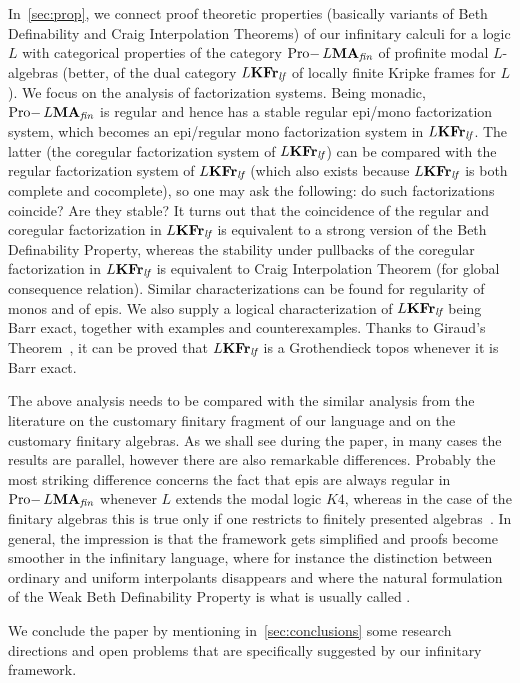 \documentclass{article}
\theoremstyle{definition}
\DeclareMathOperator{\Pro}{Pro-}
\newcommand{\KFr}{\textup{\textbf{KFr}}}
\newcommand{\MA}{\textup{\textbf{MA}}}
\newcommand{\fin}{\textit{fin}}
\newcommand{\lf}{\textit{lf}}
\begin{document}
In~\cref{sec:prop}, we connect proof theoretic properties (basically variants of Beth Definability and Craig Interpolation Theorems) of our infinitary calculi for a logic $L$ with categorical properties of the category $\Pro L\MA_\fin$ of profinite modal $L$-algebras (better, of the dual category $L\KFr_\lf$ of locally finite Kripke frames for $L$).
We focus on the analysis of factorization systems. Being monadic,  $\Pro L\MA_\fin$ is regular and hence has a stable regular epi/mono factorization system, which becomes an epi/regular mono factorization system in $L\KFr_\lf$. The latter (the coregular factorization system of $L\KFr_\lf$) can be compared with the regular factorization system of $L\KFr_\lf$ (which also exists because $L\KFr_\lf$ is both complete and cocomplete), so one may ask the following: do such factorizations coincide? Are they stable? It turns out that the coincidence of the regular and coregular factorization in $L\KFr_\lf$ is equivalent to a strong version of the Beth Definability Property, whereas the stability under pullbacks of the coregular factorization in $L\KFr_\lf$ is equivalent to Craig Interpolation Theorem (for global consequence relation). Similar characterizations can be found for regularity of monos and of epis.  
We also supply a logical characterization of $L\KFr_\lf$ being Barr exact, together with examples and counterexamples. Thanks to Giraud's Theorem~\cite[Theorem 1.4.5]{makkaireyes}, it can be proved that $L\KFr_\lf$ is a Grothendieck topos whenever it is Barr exact.

The above analysis needs to be compared with the similar analysis from the literature on the customary finitary fragment of our language and on the customary finitary algebras. As we shall see during the paper, in many cases the results are parallel, however there are also remarkable differences. Probably the most striking difference concerns the fact that epis are always regular in $\Pro L\MA_\fin$ whenever $L$ extends the modal logic $K4$, whereas in the case of the finitary algebras this is true only if one restricts to finitely presented algebras~\cite{Mak92,Ghi-Zaw}. In general, the impression is that the framework gets simplified and proofs become smoother in the infinitary language, where for instance  the distinction between ordinary and uniform interpolants disappears and where the natural formulation of the Weak Beth Definability Property is what is usually called \cite{blok,Mor20}.

We conclude the paper by mentioning in~\cref{sec:conclusions} some  research directions and open problems that are specifically suggested by our infinitary framework.
\end{document}
